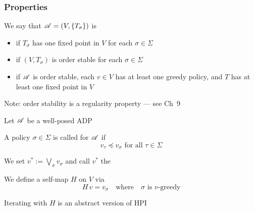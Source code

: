 \documentclass[dvipsnames]{beamer}
\begin{document}
\begin{frame}
    \frametitle{Properties}
    
    We say that $\mathscr A = (V, \{T_\sigma\})$ is
    
    \begin{itemize}
        \item {} if $T_\sigma$ has one fixed point in
            $V$ for each $\sigma \in \Sigma$
            \vspace{0.5em}
            \vspace{0.5em}
        \item {} if $(V, T_\sigma)$ is order stable for each
            $\sigma \in \Sigma$
            \vspace{0.5em}
            \vspace{0.5em}
        \item {} if $\mathscr A$ is order stable, each $v \in V$ has at
            least one greedy policy, and $T$ has at least one fixed point in
            $V$
    \end{itemize}

            \vspace{0.5em}
            \vspace{0.5em}
            \vspace{0.5em}
    Note: order stability is a regularity property --- see Ch~9

\end{frame}


\begin{frame}

    Let $\mathscr A$ be a well-posed ADP 

            \vspace{0.5em}
            \vspace{0.5em}
    A policy $\sigma \in \Sigma$ is called  for $\mathscr A$ if
    \begin{equation*}
        v_\tau \preceq v_\sigma
        \text{ for all }
        \tau \in \Sigma
    \end{equation*}

            \vspace{0.5em}
            \vspace{0.5em}
    We set $v^* := \bigvee_\sigma v_\sigma$ and call
    $v^*$ the 

            \vspace{0.5em}
            \vspace{0.5em}
    We define a self-map $H$ on $V$ via
    $$ 
    H \, v = v_\sigma
    \quad \text{where} \quad 
    \text{$\sigma$ is $v$-greedy}
    $$

            \vspace{0.5em}
            \vspace{0.5em}
    Iterating with $H$ is an abstract version of HPI

\end{frame}
\end{document}
